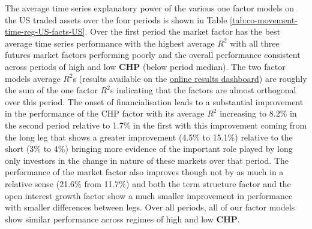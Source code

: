 \documentclass[]{elsarticle} %
\begin{document}
The average time series explanatory power of the various one factor models on the US traded assets over the four periods is shown in Table \ref{tab:co-movement-time-reg-US-facts-US}. Over the first period the market factor has the best average time series performance with the highest average \(R^{2}\) with all three futures market factors performing poorly and the overall performance consistent across periods of high and low \textbf{CHP} (below period median). The two factor models average \(R^{2}\)s (results available on the \href{http://18.135.131.217:3838/financialization-asset-pricing/}{online results dashboard}) are roughly the sum of the one factor \(R^{2}\)s indicating that the factors are almost orthogonal over this period. The onset of financialisation leads to a substantial improvement in the performance of the CHP factor with its average \(R^{2}\) increasing to 8.2\% in the second period relative to 1.7\% in the first with this improvement coming from the long leg that shows a greater improvement (4.5\% to 15.1\%) relative to the short (3\% to 4\%) bringing more evidence of the important role played by long only investors in the change in nature of these markets over that period. The performance of the market factor also improves though not by as much in a relative sense (21.6\% from 11.7\%) and both the term structure factor and the open interest growth factor show a much smaller improvement in performance with smaller differences between legs. Over all periods, all of our factor models show similar performance across regimes of high and low \textbf{CHP}.
\end{document}
